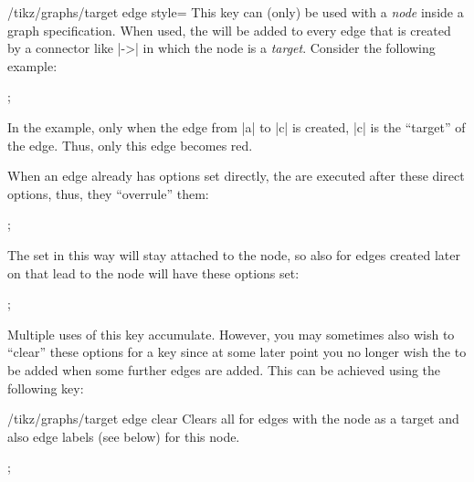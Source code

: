 \begin{key}{/tikz/graphs/target edge style=}
    This key can (only) be used with a \emph{node} inside a graph
    specification. When used, the  will be added to every edge
    that is created by a connector like |->| in which the node is a
    \emph{target}. Consider the following example:
\begin{codeexample}[preamble={\usetikzlibrary{graphs}}]
\tikz {};
\end{codeexample}
    In the example, only when the edge from |a| to |c| is created, |c| is the
    ``target'' of the edge. Thus, only this edge becomes red.

    When an edge already has options set directly, the  are
    executed after these direct options, thus, they ``overrule'' them:
\begin{codeexample}[preamble={\usetikzlibrary{graphs}}]
\tikz {};
\end{codeexample}

    The  set in this way will stay attached to the node, so also
    for edges created later on that lead to the node will have these options
    set:
\begin{codeexample}[preamble={\usetikzlibrary{graphs}}]
\tikz {};
\end{codeexample}

    Multiple uses of this key accumulate. However, you may sometimes also wish
    to ``clear'' these options for a key since at some later point you no
    longer wish the  to be added when some further edges are
    added. This can be achieved using the following key:
    \begin{key}{/tikz/graphs/target edge clear}
        Clears all  for edges with the node as a target and
        also edge labels (see below) for this node.
    \end{key}
\begin{codeexample}[preamble={\usetikzlibrary{graphs}}]
\tikz {};
\end{codeexample}
\end{key}

